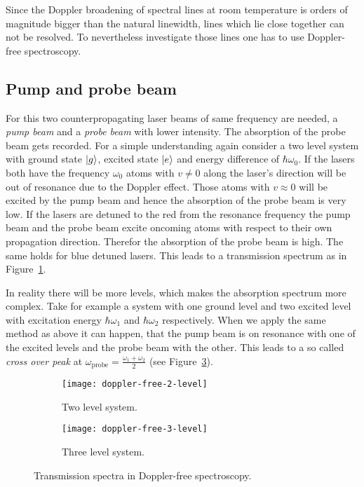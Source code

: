 \documentclass[11pt, english, fleqn, DIV=15, headinclude, BCOR=2cm]{scrreprt}
\begin{document}
Since the Doppler broadening of spectral lines at room temperature is orders of
magnitude bigger than the natural linewidth, lines which lie close together can
not be resolved. To nevertheless investigate those lines one has to use
Doppler-free spectroscopy.

\subsection{Pump and probe beam}

For this two counterpropagating laser beams of same frequency are needed, a
\emph{pump beam} and a \emph{probe beam} with lower intensity. The absorption
of the probe beam gets recorded. For a simple understanding again consider a
two level system with ground state $\ket{g}$, excited state $\ket{e}$ and
energy difference of $\hbar\omega_0$. If the lasers both have the frequency
$\omega_0$ atoms with $v\neq0$ along the laser's direction will be out of
resonance due to the Doppler effect. Those atoms with $v\approx 0$ will be
excited by the pump beam and hence the absorption of the probe beam is very
low. If the lasers are detuned to the red from the resonance frequency the pump
beam and the probe beam excite oncoming atoms with respect to their own
propagation direction. Therefor the absorption of the probe beam is high.
The same holds for blue detuned lasers. This leads to a transmission spectrum as
in Figure~\ref{fig:doppler-free-2-level}.

In reality there will be more levels, which makes the absorption spectrum more
complex. Take for example a system with one ground level and two excited level
with excitation energy $\hbar\omega_1$ and $\hbar\omega_2$ respectively. When
we apply the same method as above it can happen, that the pump beam is on
resonance with one of the excited levels and the probe beam with the other.
This leads to a so called \emph{cross over peak} at $\omega_\text{probe} =
\frac{\omega_1+\omega_2}2$ (see
Figure~\ref{fig:doppler-free-3-level}).

\begin{figure}
    \begin{subfigure}{.5\textwidth}
        \centering
        \texttt{[image: doppler-free-2-level]}
        \caption{%
            Two level system.
        }
        \label{fig:doppler-free-2-level}
    \end{subfigure}
    \hfill
    \begin{subfigure}{.5\textwidth}
        \centering
        \texttt{[image: doppler-free-3-level]}
        \caption{%
            Three level system.
        }
        \label{fig:doppler-free-3-level}
    \end{subfigure}
    \caption{%
        Transmission spectra in Doppler-free spectroscopy.
    }
\end{figure}
\end{document}
